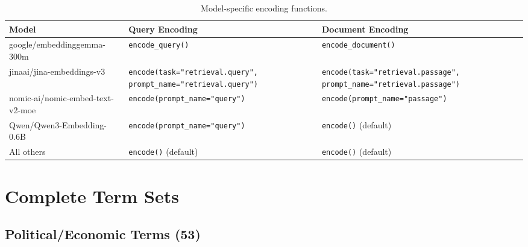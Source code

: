 \documentclass[11pt, letterpaper]{article}
\begin{document}
\begin{table}[H]
  \centering
  \footnotesize
  \begin{tabular}{lp{}p{}}
    \toprule
    Model & Query Encoding & Document Encoding \\
    \midrule
    google/embeddinggemma-300m
    & \texttt{encode\_query()}
    & \texttt{encode\_document()} \\
    jinaai/jina-embeddings-v3
    & \texttt{encode(task="retrieval.query",} \texttt{prompt\_name="retrieval.query")}
    & \texttt{encode(task="retrieval.passage",} \texttt{prompt\_name="retrieval.passage")} \\
    nomic-ai/nomic-embed-text-v2-moe
    & \texttt{encode(prompt\_name="query")}
    & \texttt{encode(prompt\_name="passage")} \\
    Qwen/Qwen3-Embedding-0.6B
    & \texttt{encode(prompt\_name="query")}
    & \texttt{encode()} (default) \\
    All others
    & \texttt{encode()} (default)
    & \texttt{encode()} (default) \\
    \bottomrule
  \end{tabular}
  \caption{Model-specific encoding functions.}
  \label{tab:encoding}
\end{table}

\section{Complete Term Sets}
\label{app:terms}

\subsection{Political/Economic Terms (53)}
\end{document}
